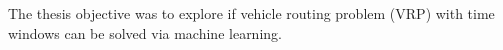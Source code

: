 \begin{conclusion}
    The thesis objective was to explore if vehicle routing problem (\gls{VRP}) with time windows can be solved via machine learning.
\end{conclusion}
